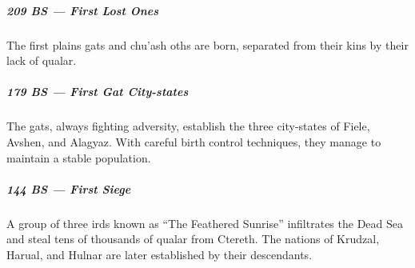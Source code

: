 \subparagraph{209 BS --- First Lost Ones} The first plains gats and chu'ash oths are born, separated from their kins by their lack of qualar.

\subparagraph{179 BS --- First Gat City-states} The gats, always fighting adversity, establish the three city-states of Fiele, Avshen, and Alagyaz.
With careful birth control techniques, they manage to maintain a stable population.

\subparagraph{144 BS --- First Siege} A group of three irds known as ``The Feathered Sunrise'' infiltrates the Dead Sea and steal tens of thousands of qualar from Ctereth.
The nations of Krudzal, Harual, and Hulnar are later established by their descendants.

